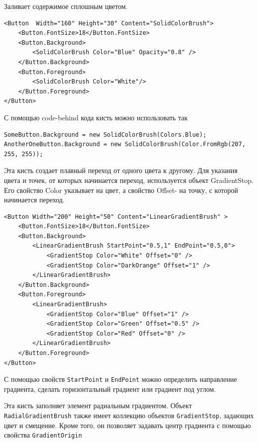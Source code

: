 \begin{description}[style=nextline]
\item [\texttt{SolidColorBrush}] Заливает содержимое сплошным цветом.

\begin{verbatim}
<Button  Width="160" Height="30" Content="SolidColorBrush">
    <Button.FontSize>18</Button.FontSize>
    <Button.Background>
        <SolidColorBrush Color="Blue" Opacity="0.8" />
    </Button.Background>
    <Button.Foreground>
        <SolidColorBrush Color="White"/>
    </Button.Foreground>
</Button>
\end{verbatim}

С помощью code-behind кода кисть можно использовать так

\begin{verbatim}
SomeButton.Background = new SolidColorBrush(Colors.Blue);
AnotherOneButton.Background = new SolidColorBrush(Color.FromRgb(207, 255, 255));
\end{verbatim}

\item [\texttt{LinearGradientBrush}] Эта кисть создает плавный переход от одного цвета к другому. Для указания цвета и точек, от которых начинается переход, используется объект GradientStop. Его свойство Color указывает на цвет, а свойство Offset- на точку, с которой начинается переход.

\begin{verbatim}
<Button Width="200" Height="50" Content="LinearGradientBrush" >
    <Button.FontSize>18</Button.FontSize>
    <Button.Background>
        <LinearGradientBrush StartPoint="0.5,1" EndPoint="0.5,0">
            <GradientStop Color="White" Offset="0" />
            <GradientStop Color="DarkOrange" Offset="1" />
        </LinearGradientBrush>
    </Button.Background>
    <Button.Foreground>
        <LinearGradientBrush>
            <GradientStop Color="Blue" Offset="1" />
            <GradientStop Color="Green" Offset="0.5" />
            <GradientStop Color="Red" Offset="0" />
        </LinearGradientBrush>
    </Button.Foreground>
</Button>
\end{verbatim}

С помощью свойств \texttt{StartPoint} и \texttt{EndPoint} можно определить направление градиента, сделать горизонтальный градиент или градиент под углом.

\item [\texttt{RadialGradientBrush}] Эта кисть заполняет элемент радиальным градиентом. Объект \texttt{RadialGradientBrush} также имеет коллекцию объектов \texttt{GradientStop}, задающих цвет и смещение. Кроме того, он позволяет задавать центр градиента с помощью свойства \texttt{GradientOrigin}


\end{description}
